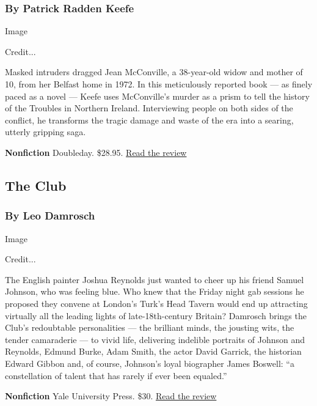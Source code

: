 \hypertarget{by-patrick-radden-keefe}{%
\subsubsection{By Patrick Radden Keefe}\label{by-patrick-radden-keefe}}

Image

Credit...

Masked intruders dragged Jean McConville, a 38-year-old widow and mother
of 10, from her Belfast home in 1972. In this meticulously reported book
--- as finely paced as a novel --- Keefe uses McConville's murder as a
prism to tell the history of the Troubles in Northern Ireland.
Interviewing people on both sides of the conflict, he transforms the
tragic damage and waste of the era into a searing, utterly gripping
saga.

\textbf{Nonfiction} \textbar{} Doubleday. \$28.95. \textbar{}
\href{https://www.nytimes3xbfgragh.onion/2019/02/22/books/review/say-nothing-patrick-radden-keefe.html}{Read
the review}

\hypertarget{the-club}{%
\subsection{The Club}\label{the-club}}

\hypertarget{by-leo-damrosch}{%
\subsubsection{By Leo Damrosch}\label{by-leo-damrosch}}

Image

Credit...

The English painter Joshua Reynolds just wanted to cheer up his friend
Samuel Johnson, who was feeling blue. Who knew that the Friday night gab
sessions he proposed they convene at London's Turk's Head Tavern would
end up attracting virtually all the leading lights of late-18th-century
Britain? Damrosch brings the Club's redoubtable personalities --- the
brilliant minds, the jousting wits, the tender camaraderie --- to vivid
life, delivering indelible portraits of Johnson and Reynolds, Edmund
Burke, Adam Smith, the actor David Garrick, the historian Edward Gibbon
and, of course, Johnson's loyal biographer James Boswell: ``a
constellation of talent that has rarely if ever been equaled.''

\textbf{Nonfiction} \textbar{} Yale University Press. \$30. \textbar{}
\href{https://www.nytimes3xbfgragh.onion/2019/04/05/books/review/leo-damrosch-club.html}{Read
the review}

